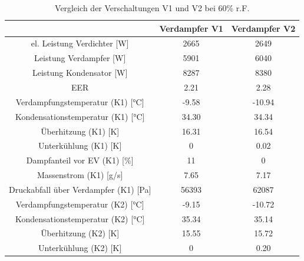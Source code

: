 \begin{table}[h!]
\centering
\caption{Vergleich der Verschaltungen V1 und V2 bei 60\% r.F.}
\label{tab:VergleichV1V2_60rF}
\begin{tabular}{|ccc|}
\hline

                                                                & Verdampfer V1               & Verdampfer V2 \\ \hline
\multicolumn{1}{|c|}{el. Leistung Verdichter {[}W{]}}           & \multicolumn{1}{c|}{2665}   & 2649          \\
\multicolumn{1}{|c|}{Leistung Verdampfer {[}W{]}}               & \multicolumn{1}{c|}{5901}   & 6040          \\
\multicolumn{1}{|c|}{Leistung Kondensator {[}W{]}}             & \multicolumn{1}{c|}{8287}   & 8380          \\
\multicolumn{1}{|c|}{EER}                                       & \multicolumn{1}{c|}{2.21}   & 2.28          \\ \hline
\multicolumn{1}{|c|}{Verdampfungstemperatur (K1) {[}°C{]}}      & \multicolumn{1}{c|}{-9.58}  & -10.94        \\
\multicolumn{1}{|c|}{Kondensationstemperatur (K1) {[}°C{]}}    & \multicolumn{1}{c|}{34.30}  & 34.34         \\
\multicolumn{1}{|c|}{Überhitzung (K1) {[}K{]}}                  & \multicolumn{1}{c|}{16.31}  & 16.54         \\
\multicolumn{1}{|c|}{Unterkühlung (K1) {[}K{]}}                 & \multicolumn{1}{c|}{0}      & 0.02          \\
\multicolumn{1}{|c|}{Dampfanteil vor EV (K1) {[}\%{]}}          & \multicolumn{1}{c|}{11}     & 0             \\
\multicolumn{1}{|c|}{Massenstrom (K1) {[}g/s{]}}                & \multicolumn{1}{c|}{7.65}   & 7.17          \\
\multicolumn{1}{|c|}{Druckabfall über Verdampfer (K1) {[}Pa{]}} & \multicolumn{1}{c|}{56393}  & 62087         \\ \hline
\multicolumn{1}{|c|}{Verdampfungstemperatur (K2) {[}°C{]}}      & \multicolumn{1}{c|}{-9.15}  & -10.72        \\
\multicolumn{1}{|c|}{Kondensationstemperatur (K2) {[}°C{]}}    & \multicolumn{1}{c|}{35.34}  & 35.14         \\
\multicolumn{1}{|c|}{Überhitzung (K2) {[}K{]}}                  & \multicolumn{1}{c|}{15.55}  & 15.72         \\
\multicolumn{1}{|c|}{Unterkühlung (K2) {[}K{]}}                 & \multicolumn{1}{c|}{0}      & 0.20          \\

\end{tabular}
\end{table}

